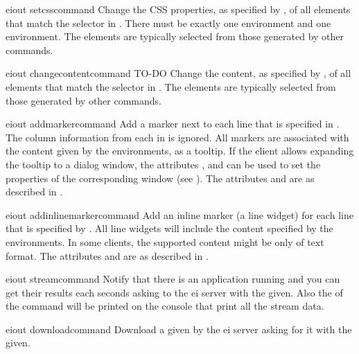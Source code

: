 \bigskip
\xmlstruct
{eiout}
{setcsscommand}
{%
%
  Change the CSS properties, as specified by
  , of all elements that match the
  selector in .
%
  There must be exactly one  environment and
  one  environment. 
%
  The elements are typically selected from those generated by other
  commands.
%
}


\bigskip
\xmlstruct
{eiout}
{changecontentcommand}
{%
% 
  TO-DO
%
  Change the content, as specified by
  , of all elements that match the
  selector in .
%
  The elements are typically selected from those generated by other
  commands.
%
}

\bigskip
\xmlstruct
{eiout}
{addmarkercommand}
{%
%
  Add a marker next to each line that is specified in
  . The column information from each
   in  is
  ignored.  All markers are associated with the content given by the
   environments, as a tooltip. If the
  client allows expanding the tooltip to a dialog window, the
  attributes ,  and
   can be used to set the properties of the
  corresponding window (see ).
%
  The attributes  and  are
  as described in .
%
}

\bigskip
\xmlstruct
{eiout}
{addinlinemarkercommand}
{%
%
  Add an inline marker (a line widget) for each line that is specified
  by . All line widgets will include the content
  specified by the  environments. In some
  clients, the supported content might be only of text format.
%
  The attributes  and  are
  as described in .
%
}

\bigskip
\xmlstruct
{eiout}
{streamcommand}
{%
%
  Notify that there is an application running and you can get their
  results each  seconds asking to the ei server
  with the  given.
  Also the  of the command will be
  printed on the console  that print all the
  stream data. 
%
}

\bigskip
\xmlstruct
{eiout}
{downloadcommand}
{%
%
  Download a  given by the ei server asking for it
  with the  given.
%
}


